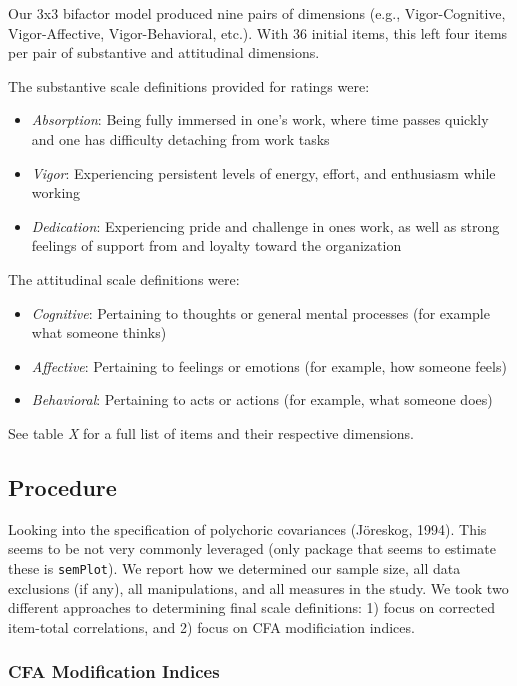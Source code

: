 \documentclass[
  english,
  man]{apa6}
\begin{document}
Our 3x3 bifactor model produced nine pairs of dimensions (e.g., Vigor-Cognitive, Vigor-Affective, Vigor-Behavioral, etc.). With 36 initial items, this left four items per pair of substantive and attitudinal dimensions.

The substantive scale definitions provided for ratings were:

\begin{itemize}
\item
  \emph{Absorption}: Being fully immersed in one's work, where time passes quickly and one has difficulty detaching from work tasks
\item
  \emph{Vigor}: Experiencing persistent levels of energy, effort, and enthusiasm while working
\item
  \emph{Dedication}: Experiencing pride and challenge in ones work, as well as strong feelings of support from and loyalty toward the organization
\end{itemize}

The attitudinal scale definitions were:

\begin{itemize}
\item
  \emph{Cognitive}: Pertaining to thoughts or general mental processes (for example what someone thinks)
\item
  \emph{Affective}: Pertaining to feelings or emotions (for example, how someone feels)
\item
  \emph{Behavioral}: Pertaining to acts or actions (for example, what someone does)
\end{itemize}

See table \emph{X} for a full list of items and their respective dimensions.

\hypertarget{procedure}{%
\subsection{Procedure}\label{procedure}}

Looking into the specification of polychoric covariances (Jöreskog, 1994). This seems to be not very commonly leveraged (only package that seems to estimate these is \texttt{semPlot}). We report how we determined our sample size, all data exclusions (if any), all manipulations, and all measures in the study. We took two different approaches to determining final scale definitions: 1) focus on corrected item-total correlations, and 2) focus on CFA modificiation indices.

\hypertarget{cfa-modification-indices}{%
\subsubsection{CFA Modification Indices}\label{cfa-modification-indices}}
\end{document}

